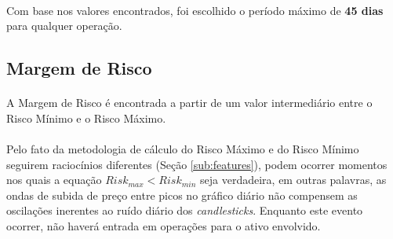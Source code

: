 \paragraph{} Com base nos valores encontrados, foi escolhido o período máximo de \textbf{45 dias} para qualquer operação.





\FloatBarrier
\subsection{Margem de Risco}
\label{sub:operation_risk}

\paragraph{} A Margem de Risco é encontrada a partir de um valor intermediário entre o Risco Mínimo e o Risco Máximo.

\paragraph{} Pelo fato da metodologia de cálculo do Risco Máximo e do Risco Mínimo seguirem raciocínios diferentes (Seção \ref{sub:features}), podem ocorrer momentos nos quais a equação \begin{math} Risk_{max} < Risk_{min} \end{math} seja verdadeira, em outras palavras, as ondas de subida de preço entre picos no gráfico diário não compensem as oscilações inerentes ao ruído diário dos \textit{candlesticks}. Enquanto este evento ocorrer, não haverá entrada em operações para o ativo envolvido.

